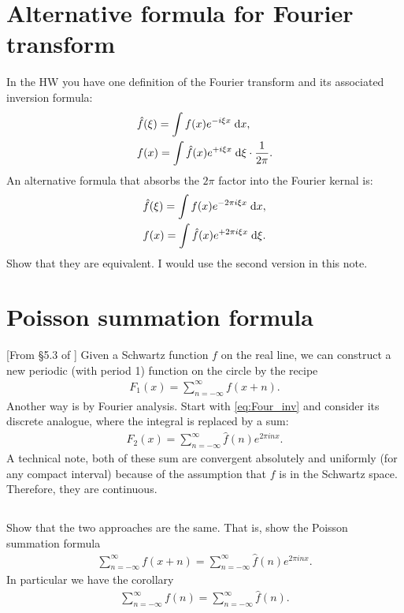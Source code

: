 \documentclass[11pt,letterpaper]{article}
\begin{document}
\section{Alternative formula for Fourier transform}
In the HW you have one definition of the Fourier transform and its associated inversion formula:
\begin{align}
    &\hat f(\xi) = \int f(x)e^{-i\xi x} \;\mathrm{d} x,\\
    &f(x) = \int \hat f(x)e^{+i\xi x} \;\mathrm{d} \xi \cdot\frac{1}{2\pi}.
\end{align}
An alternative formula that absorbs the $2\pi$ factor into the Fourier kernal is:
\begin{align}
    &\hat f(\xi ) = \int f(x)e^{-2\pi i\xi x} \;\mathrm{d} x,\\
    &f(x) = \int \hat f(x)e^{+2\pi i \xi x} \;\mathrm{d} \xi \label{eq:Four_inv}.
\end{align}
Show that they are equivalent. I would use the second version in this note.

\section{Poisson summation formula}
[From \S5.3 of \cite{SteinShakarchi_03}] Given a Schwartz function $f$ on the real line, we can construct a new periodic (with period 1) function on the circle by the recipe
\begin{align}
    F_1(x) = \sum_{n=-\infty}^\infty f(x+n).
\end{align}
Another way is by Fourier analysis. Start with \eqref{eq:Four_inv} and consider its discrete analogue, where the integral is replaced by a sum:
\begin{align}
    F_2(x) = \sum_{n=-\infty}^\infty \hat f(n)e^{2\pi inx}.
\end{align}
A technical note, both of these sum are convergent absolutely and uniformly (for any compact interval) because of the assumption that $f$ is in the Schwartz space. Therefore, they are continuous. 

\subsection{}
Show that the two approaches are the same. That is, show the Poisson summation formula
\begin{align}
    \sum_{n=-\infty}^\infty f(x+n) = \sum_{n=-\infty}^\infty \hat f(n)e^{2\pi inx}.
\end{align}
In particular we have the corollary
\begin{align}
    \sum_{n=-\infty}^\infty f(n) = \sum_{n=-\infty}^\infty \hat f(n).
\end{align}
\end{document}
